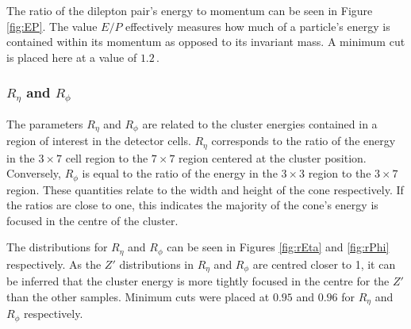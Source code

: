 \documentclass{article}
\begin{document}
The ratio of the dilepton pair's energy to momentum can be seen in Figure \ref{fig:EP}. The value $E/P$ effectively measures how much of a particle's energy is contained within its momentum as opposed to its invariant mass. A minimum cut is placed here at a value of $1.2\,$.

\subsubsection{$R_{\eta}$ and $R_{\phi}$}

The parameters $R_{\eta}$ and $R_{\phi}$ are related to the cluster energies contained in a region of interest in the detector cells. $R_{\eta}$ corresponds to the ratio of the energy in the $3\times7$ cell region to the $7\times7$ region centered at the cluster position. Conversely, $R_{\phi}$ is equal to the ratio of the energy in the $3\times3$ region to the $3\times7$ region. These quantities relate to the width and height of the cone respectively. If the ratios are close to one, this indicates the majority of the cone's energy is focused in the centre of the cluster.

The distributions for $R_{\eta}$ and $R_{\phi}$ can be seen in Figures \ref{fig:rEta} and \ref{fig:rPhi} respectively. As the $Z'$ distributions in $R_{\eta}$ and $R_{\phi}$ are centred closer to 1, it can be inferred that the cluster energy is more tightly focused in the centre for the $Z'$ than the other samples. Minimum cuts were placed at $0.95$ and $0.96$ for $R_{\eta}$ and $R_{\phi}$ respectively.
\end{document}
